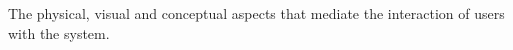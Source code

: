 \begin{definition}[Interface] \label{def:interface} 
  The physical, visual and conceptual aspects that mediate the interaction of users with the system. \cite[p. 256]{benyon14}
\end{definition}
